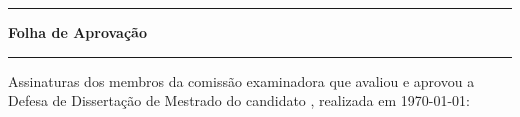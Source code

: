 \documentclass[dissertmst]{ufscar}
\begin{document}
\begin{folhadeaprovacao}
   \noindent\begin{minipage}{\textwidth}
      \begin{center}
      \rule{\linewidth}{1pt}
      \textbf{Folha de Aprovação}\\[-0.5em]
      \rule{\linewidth}{1pt}
      \end{center}
   \end{minipage}

   \begin{flushleft}
      Assinaturas dos membros da comissão examinadora que avaliou e aprovou a
      Defesa de Dissertação de Mestrado do candidato \imprimirautor{}, realizada
      em \today{}:
   \end{flushleft}
 
       
   \vspace*{\fill}
   \begin{center}
      \vspace*{0.5cm}
      {\large\imprimirlocal}
      \par
      {\large\imprimirdata}
      \vspace*{1cm}
   \end{center}
\end{folhadeaprovacao}
\end{document}
